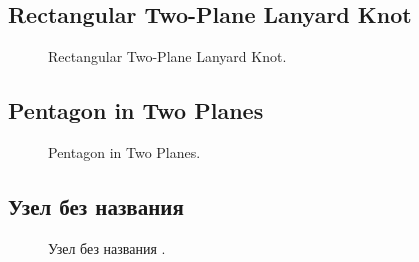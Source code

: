 \subsection{Rectangular Two-Plane Lanyard Knot}

\begin{figure}[H]\centering
	\begin{minipage}{1\linewidth}
		\begin{center}
			\tcbox[enhanced jigsaw,colframe=black,opacityframe=0.5,opacityback=0.5]
			{\centering{}}
		\end{center}
	\end{minipage}
\caption{Rectangular Two-Plane Lanyard Knot.}
\label{ris:Rectangular_Two-Plane}
\end{figure}

\subsection{Pentagon in Two Planes}

\begin{figure}[H]\centering
	\begin{minipage}{1\linewidth}
		\begin{center}
			\tcbox[enhanced jigsaw,colframe=black,opacityframe=0.5,opacityback=0.5]
			{\centering{}}
		\end{center}
	\end{minipage}
\caption{Pentagon in Two Planes.}
\label{ris:Pentagon_Two_Planes}
\end{figure}

\addtocounter{KnotNoName}{1}

\subsection{Узел без названия }

\begin{figure}[H]\centering
\end{figure}
\begin{figure}[H]\centering
	\caption{Узел без названия .}\label{ris:KnotNoName_14}
\end{figure}

